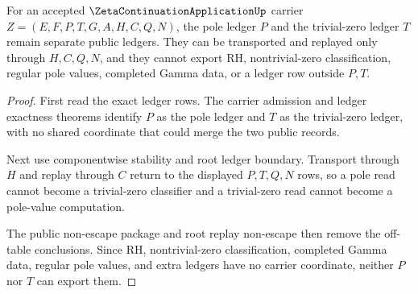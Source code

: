\begin{theorem}
\label{thm:zeta-continuation-application-pole-zero-ledger-separation}
For an accepted $\ZetaContinuationApplicationUp$ carrier
$Z=(E,F,P,T,G,A,H,C,Q,N)$, the pole ledger $P$ and the trivial-zero ledger $T$
remain separate public ledgers. They can be transported and replayed only
through $H,C,Q,N$, and they cannot export RH, nontrivial-zero classification,
regular pole values, completed Gamma data, or a ledger row outside $P,T$.
\end{theorem}
\begin{proof}
First read the exact ledger rows. The carrier admission and ledger exactness
theorems identify $P$ as the pole ledger and $T$ as the trivial-zero ledger,
with no shared coordinate that could merge the two public records.

Next use componentwise stability and root ledger boundary. Transport through
$H$ and replay through $C$ return to the displayed $P,T,Q,N$ rows, so a pole
read cannot become a trivial-zero classifier and a trivial-zero read cannot
become a pole-value computation.

The public non-escape package and root replay non-escape then remove the
off-table conclusions. Since RH, nontrivial-zero classification, completed
Gamma data, regular pole values, and extra ledgers have no carrier coordinate,
neither $P$ nor $T$ can export them.
\end{proof}

